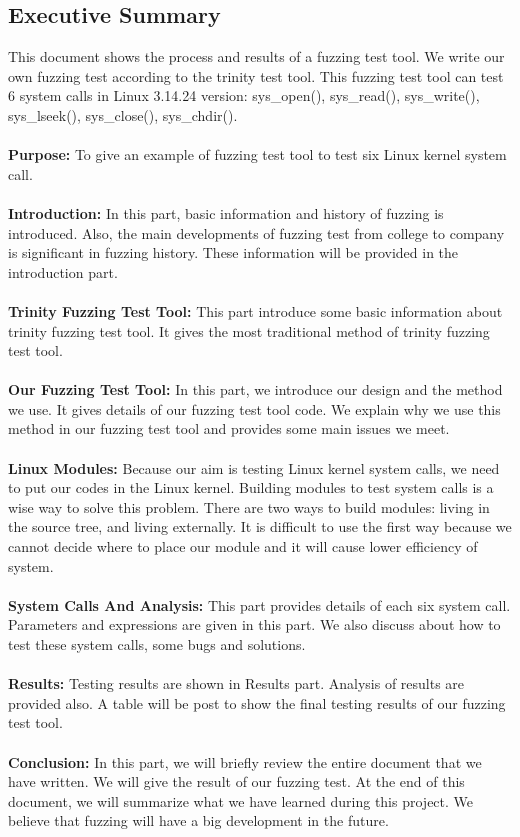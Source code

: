 \documentclass[twoside]{article}
\begin{document}
\begin{multicols}{2} %

\section{Executive Summary}
This document shows the process and results of a fuzzing test tool. We write our own fuzzing test according to the trinity test tool. This fuzzing test tool can test 6 system calls in Linux 3.14.24 version: sys\_open(),  sys\_read(), sys\_write(), sys\_lseek(), sys\_close(), sys\_chdir().
\\\\
\noindent
{\bf Purpose:} To give an example of fuzzing test tool to test six Linux kernel system call.
\\\\
\noindent
{\bf Introduction:} In this part, basic information and history of fuzzing is introduced. Also, the main developments of fuzzing test from college to company is significant in fuzzing history. These information will be provided in the introduction part.
\\\\
\noindent
{\bf Trinity Fuzzing Test Tool:} This part introduce some basic information about trinity fuzzing test tool. It gives the most traditional method of trinity fuzzing test tool.
\\\\
\noindent
{\bf Our Fuzzing Test Tool:} In this part, we introduce our design and the method we use. It gives details of our fuzzing test tool code. We explain why we use this method in our fuzzing test tool and provides some main issues we meet. 
\\\\
\noindent
{\bf Linux Modules:} Because our aim is testing Linux kernel system calls, we need to put our codes in the Linux kernel. Building modules to test system calls is a wise way to solve this problem. There are two ways to build  modules: living in the source tree, and living externally. It is difficult to use the first way because we cannot decide where to place our module and it will cause lower efficiency of system.
\\\\
\noindent
{\bf System Calls And Analysis:} This part provides details of each six system call. Parameters and expressions are given in this part. We also discuss about how to test these system calls, some bugs and solutions. 
\\\\
\noindent
{\bf Results:} Testing results are shown in Results part. Analysis of results are provided also. A table will be post to show the final testing results of our fuzzing test tool.
\\\\
\noindent
{\bf Conclusion:} In this part, we will briefly review the entire document that we have written. We will give the result of our fuzzing test. At the end of this document, we will summarize what we have learned during this project. We believe that fuzzing will have a big development in the future.   	 



\end{multicols}
\end{document}
